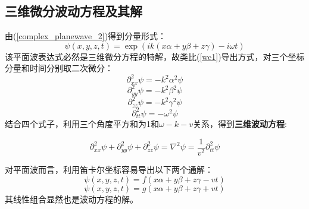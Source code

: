 \documentclass[12pt]{ctexart}%
\begin{document}
\subsection*{三维微分波动方程及其解}
由(\ref{complex_planewave_2})得到分量形式：
\begin{equation}
    \psi(x,y,z,t)=\exp(ik(x\alpha+y\beta+z\gamma)-i\omega t)
\end{equation}
该平面波表达式必然是三维微分方程的特解，故类比(\ref{we1})导出方式，对三个坐标分量和时间分别取二次微分：
\begin{equation}
    \partial^2_{xx}\psi=-k^2\alpha^2\psi
\end{equation}
\begin{equation}
    \partial^2_{yy}\psi=-k^2\beta^2\psi
\end{equation}
\begin{equation}
    \partial^2_{zz}\psi=-k^2\gamma^2\psi
\end{equation}
\begin{equation}
    \partial^2_{tt}\psi=-\omega^2\psi
\end{equation}
结合四个式子，利用三个角度平方和为1和$\omega-k-v$关系，得到\textbf{三维波动方程}:
\begin{framed}
    \begin{equation}
        \partial^2_{xx}\psi+\partial^2_{yy}\psi+\partial^2_{zz}\psi=\nabla^2\psi=\frac{1}{v^2}\partial^2_{tt}\psi
    \end{equation}
\end{framed}
\par 对平面波而言，利用笛卡尔坐标容易导出以下两个通解：
\begin{equation}
    \psi(x,y,z,t)=f(x\alpha+y\beta+z\gamma-vt)
\end{equation}
\begin{equation}
    \psi(x,y,z,t)=g(x\alpha+y\beta+z\gamma+vt)
\end{equation}
其线性组合显然也是波动方程的解。
\end{document}
